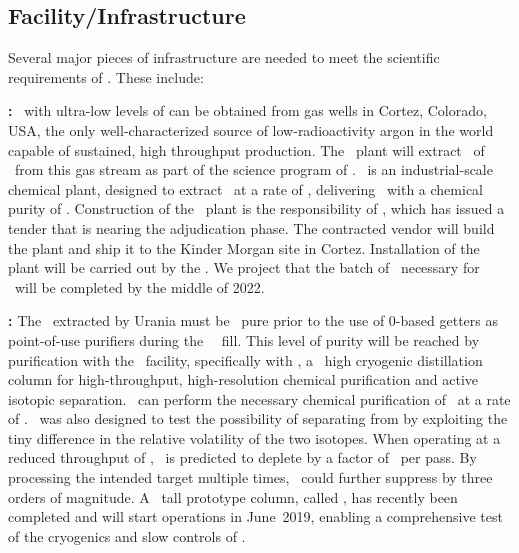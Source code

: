 \begin{asparaenum}

\end{asparaenum}


\subsection{Facility/Infrastructure}

Several major pieces of infrastructure are needed to meet the scientific requirements of \DSks. These include:

\begin{asparaenum}

\item[\bf \Urania:]
\UAr\ with ultra-low levels of  can be obtained from gas wells in Cortez, Colorado, USA, the only well-characterized source of low-radioactivity argon in the world capable of sustained, high throughput production.  The \Urania\ plant will extract \UraniaTotalDSkProduction\ of \UAr\ from this gas stream as part of the science program of \DSks. \Urania\ is an industrial-scale chemical plant, designed to extract \UAr\ at a rate of \UraniaUArRate, delivering \UAr\ with a chemical purity of \UraniaArFinalPurity.  Construction of the \Urania\ plant is the responsibility of \INFN, which has issued a tender that is nearing the adjudication phase.  The contracted vendor will build the plant and ship it to the Kinder Morgan site in Cortez.  Installation of the plant will be carried out by the \GADMC.  We project that the batch of \UAr\ necessary for \DSks\ will be completed by the middle of 2022.

\item[\bf \Aria:]
The \UAr\ extracted by Urania must be \AriaArFinalPurity\ pure prior to the use of 0-based getters as point-of-use purifiers during the \DSk\ \LArTPC\ fill. This level of purity will be reached by purification with the \Aria\ facility, specifically with \SeruciOne, a \AriaSeruciHeight\ high cryogenic distillation column for high-throughput, high-resolution chemical purification and active isotopic separation.  \SeruciOne\ can perform the necessary chemical purification of \UAr\ at a rate of \AriaChemicalRate.  \SeruciOne\ was also designed to test the possibility of separating  from  by exploiting the tiny difference in the relative volatility of the two isotopes. When operating at a reduced throughput of \AriaSeruciOneRate, \SeruciOne\ is predicted to deplete  by a factor of \AriaDepletionPerPass\ per pass. By processing the intended target multiple times, \SeruciOne\ could further suppress  by three orders of magnitude. A \AriaNuraxiHeight\ tall prototype column, called \SeruciZero, has recently been completed and will start operations in June~2019, enabling a comprehensive test of the cryogenics and slow controls of \SeruciOne.


\end{asparaenum}
